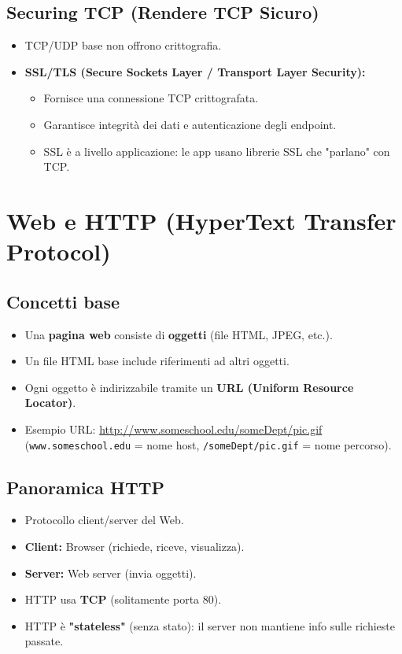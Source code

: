 \subsection{Securing TCP (Rendere TCP Sicuro)}
\begin{itemize}
    \item TCP/UDP base non offrono crittografia.
    \item \textbf{SSL/TLS (Secure Sockets Layer / Transport Layer Security):}
    \begin{itemize}
        \item Fornisce una connessione TCP crittografata.
        \item Garantisce integrità dei dati e autenticazione degli endpoint.
        \item SSL è a livello applicazione: le app usano librerie SSL che "parlano" con TCP.
    \end{itemize}
\end{itemize}

\section{Web e HTTP (HyperText Transfer Protocol)}
\subsection{Concetti base}
\begin{itemize}
    \item Una \textbf{pagina web} consiste di \textbf{oggetti} (file HTML, JPEG, etc.).
    \item Un file HTML base include riferimenti ad altri oggetti.
    \item Ogni oggetto è indirizzabile tramite un \textbf{URL (Uniform Resource Locator)}.
    \item Esempio URL: \url{http://www.someschool.edu/someDept/pic.gif}
    (\texttt{www.someschool.edu} = nome host, \texttt{/someDept/pic.gif} = nome percorso).
\end{itemize}

\subsection{Panoramica HTTP}
\begin{itemize}
    \item Protocollo client/server del Web.
    \item \textbf{Client:} Browser (richiede, riceve, visualizza).
    \item \textbf{Server:} Web server (invia oggetti).
    \item HTTP usa \textbf{TCP} (solitamente porta 80).
    \item HTTP è \textbf{"stateless"} (senza stato): il server non mantiene info sulle richieste passate.
\end{itemize}

